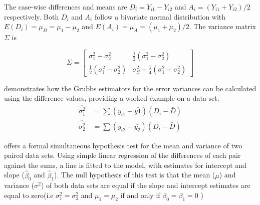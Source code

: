 \documentclass[12pt, a4paper]{report}
\theoremstyle{plain}
\theoremstyle{definition}
\theoremstyle{remark}
\begin{document}
	
		
		The case-wise differences and means are $D_{i} = Y_{i1}-Y_{i2}$
		and $A_{i} = (Y_{i1}+Y_{i2})/2$  respectively. Both $D_{i}$ and
		$A_{i}$ follow a bivariate normal distribution with $E(D_{i})=
		\mu_{D} = \mu_{1} - \mu_{2}$ and $E(A_{i})= \mu_{A} = (\mu_{1} +
		\mu_{2})/2$. The variance matrix $\Sigma$ is
		
		\begin{equation}
			\Sigma = \left[\begin{matrix}
				\sigma^{2}_{1}+\sigma^{2}_{2}&\frac{1}{2}(\sigma^{2}_{1}-\sigma^{2}_{2})\\
				\frac{1}{2}(\sigma^{2}_{1}-\sigma^{2}_{2})&\sigma^{2}_{S}+
				\frac{1}{4}(\sigma^{2}_{1}+\sigma^{2}_{2})
			\end{matrix} \right]
		\end{equation}
		
		
		
		
		
		\citet{Kinsella} demonstrates how the Grubbs estimators for the
		error variances can be calculated using the difference values,
		providing a worked example on a data set.
		\begin{eqnarray}
			\hat{\sigma^{2}_{1}}
			\quad=\sum{(y_{i1}-\bar{y{1}})(D_{i}-\bar{D})}\\
			\hat{\sigma^{2}_{2}} \quad=
			\sum{(y_{i2}-\bar{y_{2}})(D_{i}-\bar{D})} \nonumber
		\end{eqnarray}
		
		
		
		\citet{BB89} offers a formal simultaneous hypothesis test for the
		mean and variance of two paired data sets. Using simple linear
		regression of the differences of each pair against the sums, a
		line is fitted to the model, with estimates for intercept and
		slope ($\hat{\beta}_{0}$ and $\hat{\beta}_{1}$). The null
		hypothesis of this test is that the mean ($\mu$) and variance
		($\sigma^{2}$) of both data sets are equal if the slope and
		intercept estimates are equal to zero(i.e $\sigma^{2}_{1} =
		\sigma^{2}_{2}$ and $\mu_{1}=\mu_{2}$ if and only if $\beta_{0}=
		\beta_{1}=0$ )
		
\end{document}
